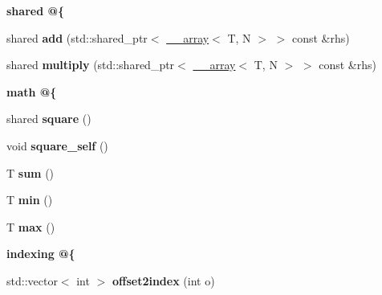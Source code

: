\begin{Indent}{\bf shared @\{}\par
{\em \label{_amgrpd7747f34a02ed4bfc358438fccf29bd2}
 }\begin{DoxyCompactItemize}
\item 
\hypertarget{class____array_ab20b7f53c81ac31b349d31bc58e650f6}{
shared {\bfseries add} (std::shared\_\-ptr$<$ \hyperlink{class____array}{\_\-\_\-array}$<$ T, N $>$ $>$ const \&rhs)}
\label{class____array_ab20b7f53c81ac31b349d31bc58e650f6}

\item 
\hypertarget{class____array_a35d7cfec43ce9f395f148b64a6083a69}{
shared {\bfseries multiply} (std::shared\_\-ptr$<$ \hyperlink{class____array}{\_\-\_\-array}$<$ T, N $>$ $>$ const \&rhs)}
\label{class____array_a35d7cfec43ce9f395f148b64a6083a69}

\end{DoxyCompactItemize}
\end{Indent}
\begin{Indent}{\bf math @\{}\par
{\em \label{_amgrpe9ff367b69dd3dff64e14cb45d1def75}
 }\begin{DoxyCompactItemize}
\item 
\hypertarget{class____array_a566abb01d09bf563edf9f7f761b4317d}{
shared {\bfseries square} ()}
\label{class____array_a566abb01d09bf563edf9f7f761b4317d}

\item 
\hypertarget{class____array_ad6e7fc66551df684d4337929b8636446}{
void {\bfseries square\_\-self} ()}
\label{class____array_ad6e7fc66551df684d4337929b8636446}

\item 
\hypertarget{class____array_acd4f2a6476211e9d948a0d8ae884a3cc}{
T {\bfseries sum} ()}
\label{class____array_acd4f2a6476211e9d948a0d8ae884a3cc}

\item 
\hypertarget{class____array_a2edfd07e97b1fdca31ad463f2ef9962f}{
T {\bfseries min} ()}
\label{class____array_a2edfd07e97b1fdca31ad463f2ef9962f}

\item 
\hypertarget{class____array_a9489124f312f9409853b9bf29b6dd585}{
T {\bfseries max} ()}
\label{class____array_a9489124f312f9409853b9bf29b6dd585}

\end{DoxyCompactItemize}
\end{Indent}
\begin{Indent}{\bf indexing @\{}\par
{\em \label{_amgrpb03795d8aada5c57702ba43410fed4a7}
 }\begin{DoxyCompactItemize}
\item 
\hypertarget{class____array_ab5755f3be1a48c4c62a12adc512dac16}{
std::vector$<$ int $>$ {\bfseries offset2index} (int o)}
\label{class____array_ab5755f3be1a48c4c62a12adc512dac16}

\end{DoxyCompactItemize}
\end{Indent}
